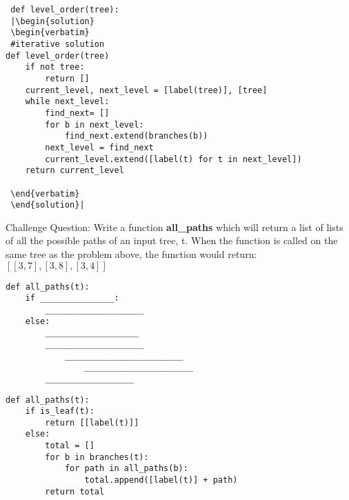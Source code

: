  \begin{lstlisting}
 def level_order(tree):
 |\begin{solution}
 \begin{verbatim}
 #iterative solution
def level_order(tree)
    if not tree:
        return []
    current_level, next_level = [label(tree)], [tree]
    while next_level:
        find_next= []
        for b in next_level:
            find_next.extend(branches(b))
        next_level = find_next
        current_level.extend([label(t) for t in next_level])
    return current_level
    
 \end{verbatim}
 \end{solution}|
 \end{lstlisting}
 \hfill\break
\hfill\break
\hfill\break
 \hfill\break
\hfill\break
\hfill\break

\question 
Challenge Question: Write a function \textbf{all\_paths} which will return a list of lists of all the possible paths of an input tree, t. When the function is called on the same tree as the problem above, the function would return: $[[3,7],[3,8],[3,4]]$
\begin{lstlisting}
def all_paths(t):
    if _______________:
        ____________________
    else:
        ___________________
        ____________________
            ________________________
                ______________________
        __________________
\end{lstlisting}
\begin{solution}
\begin{lstlisting}
def all_paths(t):
    if is_leaf(t):
        return [[label(t)]]
    else:
        total = []
        for b in branches(t):
            for path in all_paths(b):
                total.append([label(t)] + path)
        return total
\end{lstlisting}
\end{solution}

